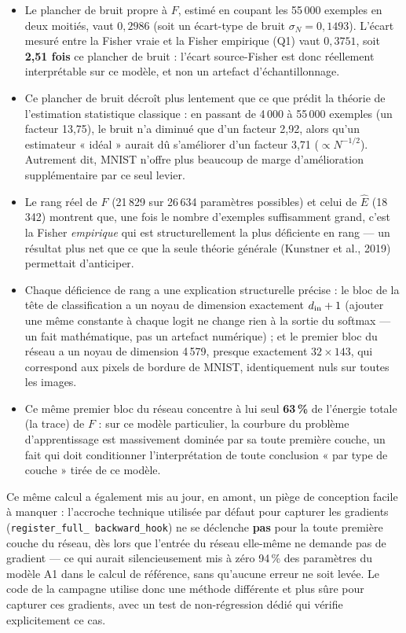 \documentclass[11pt,a4paper]{article}
\begin{document}
\begin{mesure}
\begin{itemize}[leftmargin=1.3em]
\item Le plancher de bruit propre à $F$, estimé en coupant les 55\,000 exemples en deux moitiés,
vaut $0{,}2986$ (soit un écart-type de bruit $\sigma_N=0{,}1493$). L'écart mesuré entre la Fisher
vraie et la Fisher empirique (Q1) vaut $0{,}3751$, soit \textbf{2,51 fois} ce plancher de bruit :
l'écart source-Fisher est donc réellement interprétable sur ce modèle, et non un artefact
d'échantillonnage.
\item Ce plancher de bruit décroît plus lentement que ce que prédit la théorie de l'estimation
statistique classique : en passant de 4\,000 à 55\,000 exemples (un facteur 13,75), le bruit n'a
diminué que d'un facteur 2,92, alors qu'un estimateur « idéal » aurait dû s'améliorer d'un facteur
3,71 ($\propto N^{-1/2}$). Autrement dit, MNIST n'offre plus beaucoup de marge d'amélioration
supplémentaire par ce seul levier.
\item Le rang réel de $F$ (21\,829 sur 26\,634 paramètres possibles) et celui de $\hat E$ (18\,342)
montrent que, une fois le nombre d'exemples suffisamment grand, c'est la Fisher \emph{empirique} qui
est structurellement la plus déficiente en rang — un résultat plus net que ce que la seule théorie
générale (Kunstner et al., 2019) permettait d'anticiper.
\item Chaque déficience de rang a une explication structurelle précise : le bloc de la tête de
classification a un noyau de dimension exactement $d_{\rm in}+1$ (ajouter une même constante à
chaque logit ne change rien à la sortie du softmax — un fait mathématique, pas un artefact
numérique) ; et le premier bloc du réseau a un noyau de dimension 4\,579, presque exactement
$32\times143$, qui correspond aux pixels de bordure de MNIST, identiquement nuls sur toutes les
images.
\item Ce même premier bloc du réseau concentre à lui seul \textbf{63\,\%} de l'énergie totale
(la trace) de $F$ : sur ce modèle particulier, la courbure du problème d'apprentissage est
massivement dominée par sa toute première couche, un fait qui doit conditionner l'interprétation de
toute conclusion « par type de couche » tirée de ce modèle.
\end{itemize}
\end{mesure}

Ce même calcul a également mis au jour, en amont, un piège de conception facile à manquer :
l'accroche technique utilisée par défaut pour capturer les gradients (\texttt{register\_full\_
backward\_hook}) ne se déclenche \textbf{pas} pour la toute première couche du réseau, dès lors que
l'entrée du réseau elle-même ne demande pas de gradient — ce qui aurait silencieusement mis à zéro
94\,\% des paramètres du modèle A1 dans le calcul de référence, sans qu'aucune erreur ne soit
levée. Le code de la campagne utilise donc une méthode différente et plus sûre pour capturer ces
gradients, avec un test de non-régression dédié qui vérifie explicitement ce cas.
\end{document}

